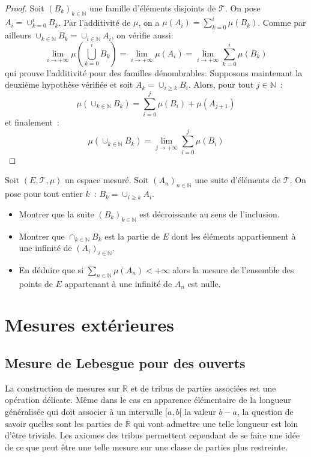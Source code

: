 \begin{proof}
Soit $(B_k)_{k \in \mathbb{N}}$ une famille d'éléments disjoints de  $\mathcal{T}$. On
pose $A_i = \cup_{k=0}^i B_k$. Par l'additivité de $\mu$, on a
$\mu(A_i) = \sum_{k=0}^i \mu(B_k)$. Comme par ailleurs $\cup_{k \in
  \mathbb{N}} B_k = \cup_{i \in \mathbb{N}} A_i$, on vérifie aussi:
\[
\lim_{i \to +\infty} \mu\left(\bigcup_{k=0}^iB_k\right) = \lim_{i \to
+\infty} \mu(A_i)= \lim_{i \to +\infty} \sum_{k=0}^i \mu(B_k)
\]
qui prouve l'additivité pour des
familles dénombrables.
Supposons maintenant la deuxième hypothèse vérifiée et soit $A_k =
\cup_{i\geq k}B_i$. Alors, pour tout $j \in \mathbb{N}$~:
\[
\mu (\cup_{k\in \mathbb{N}} B_k) = \sum_{i=0}^j \mu(B_i) + \mu(A_{j+1})
\]
et finalement~:
\[
\mu(\cup_{k \in \mathbb{N}} B_k) = \lim_{j \to +\infty}  \sum_{i=0}^j \mu(B_i)
\]
\end{proof}

\begin{exercice}
Soit $(E, \mathcal{T}, \mu)$ un espace mesuré. Soit $(A_n)_{n  \in \mathbb{N}}$ une suite d'éléments de 
$\mathcal{T}$. On pose pour tout entier $k$~: $B_k = \cup_{i \geq k} A_i$.
\begin{itemize}
  \item  Montrer que la suite $(B_k)_{k \in \mathbb{N}}$ est décroissante au
  sens de l'inclusion. 
  \item Montrer que $\cap_{k \in \mathbb{N}} B_k$ est la partie de $E$ dont les
  éléments appartiennent à une infinité de $(A_i)_{i \in  \mathbb{N}}$.
  \item En déduire que si $\sum_{n \in \mathbb{N}} \mu(A_n) < +\infty$ alors la
mesure de l'ensemble des points de $E$ appartenant à une infinité de $A_n$ est nulle.
\end{itemize}

\end{exercice}

\section{Mesures extérieures}
\subsection{Mesure de Lebesgue pour des ouverts}
La construction de mesures sur $\mathbb{R}$ et de tribus de parties
associées est une opération délicate. Même dans le cas en apparence élémentaire
de la longueur généralisée qui doit associer à un intervalle $[a,b[$ la valeur
$b-a$, la question de savoir quelles sont les parties de $\mathbb{R}$ qui vont
admettre une telle longueur est loin d'être triviale. Les axiomes des tribus
permettent cependant de se faire une idée de ce que peut être une telle mesure
 sur une classe de parties plus restreinte.

